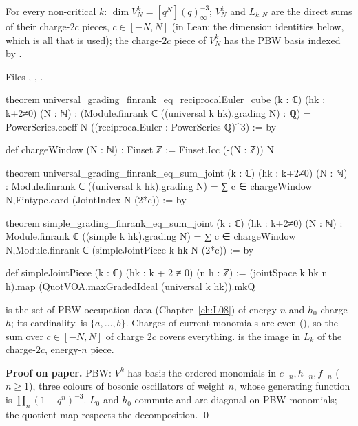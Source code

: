 \begin{theorem}\label{l20:thm:univchar}
For every non-critical $k$: $\dim V^k_N=[q^N](q)^{-3}_\infty$; $V^k_N$ and $L_{k,N}$ are the direct sums of their
charge-$2c$ pieces, $c\in[-N,N]$ (in Lean: the dimension identities below, which is all that is used); the charge-$2c$ piece of $V^k_N$ has the PBW basis indexed by .
\end{theorem}
\noindent Files ,
,
.
\begin{leancode}
theorem universal_grading_finrank_eq_reciprocalEuler_cube
    (k : ℂ) (hk : k+2≠0) (N : ℕ) :
    (Module.finrank ℂ ((universal k hk).grading N) : ℚ) =
      PowerSeries.coeff N ((reciprocalEuler : PowerSeries ℚ)^3) := by

def chargeWindow (N : ℕ) : Finset ℤ := Finset.Icc (-(N : ℤ)) N

theorem universal_grading_finrank_eq_sum_joint (k : ℂ) (hk : k+2≠0) (N : ℕ) :
    Module.finrank ℂ ((universal k hk).grading N) =
      ∑ c ∈ chargeWindow N,Fintype.card (JointIndex N (2*c)) := by

theorem simple_grading_finrank_eq_sum_joint (k : ℂ) (hk : k+2≠0) (N : ℕ) :
    Module.finrank ℂ ((simple k hk).grading N) =
      ∑ c ∈ chargeWindow N,Module.finrank ℂ (simpleJointPiece k hk N (2*c)) := by

def simpleJointPiece (k : ℂ) (hk : k + 2 ≠ 0) (n h : ℤ) :=
  (jointSpace k hk n h).map (QuotVOA.maxGradedIdeal (universal k hk)).mkQ
\end{leancode}

\begin{dictionary}
 is the set of PBW occupation data (Chapter~\ref{ch:L08}) of energy $n$ and $h_0$-charge $h$;
 its cardinality.  is $\{a,\dots,b\}$. Charges of current monomials are even
(), so the sum over $c\in[-N,N]$ of charge $2c$ covers everything. 
is the image in $L_k$ of the charge-$2c$, energy-$n$ piece.
\end{dictionary}

\textbf{Proof on paper.} PBW: $V^k$ has basis the ordered monomials in $e_{-n},h_{-n},f_{-n}$ ($n\ge1$), three colours of
bosonic oscillators of weight $n$, whose generating function is $\prod_n(1-q^n)^{-3}$. $L_0$ and $h_0$ commute and are
diagonal on PBW monomials; the quotient map respects the decomposition. \qed

